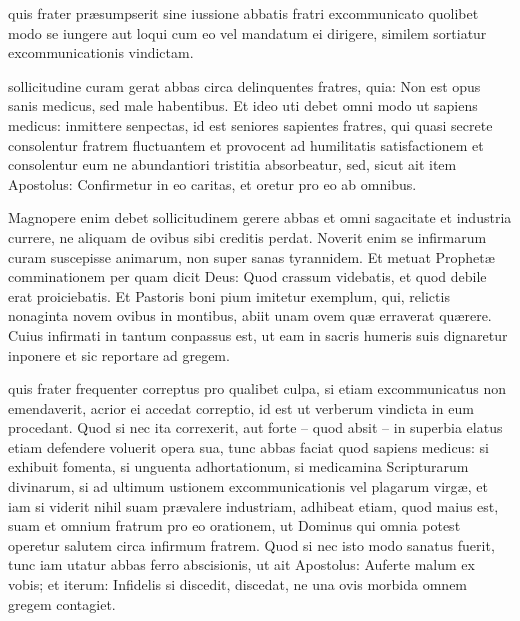 \documentclass[fontsize=9pt,paper=A6,twoside,BCOR=1mm,DIV=22,headinclude]{scrarticle}
\begin{document}
\begin{multicols}{2}
 quis frater præsumpserit sine iussione abbatis fratri excommunicato quolibet modo se iungere aut loqui cum eo vel mandatum ei dirigere, similem sortiatur excommunicationis vindictam. 

 sollicitudine curam gerat abbas circa delinquentes fratres, quia: Non est opus sanis medicus, sed male habentibus. Et ideo uti debet omni modo ut sapiens medicus: inmittere senpectas, id est seniores sapientes fratres, qui quasi secrete consolentur fratrem fluctuantem et provocent ad humilitatis satisfactionem et consolentur eum ne abundantiori tristitia absorbeatur, sed, sicut ait item Apostolus: Confirmetur in eo caritas, et oretur pro eo ab omnibus.

Magnopere enim debet sollicitudinem gerere abbas et omni sagacitate et industria currere, ne aliquam de ovibus sibi creditis perdat. Noverit enim se infirmarum curam suscepisse animarum, non super sanas tyrannidem. Et metuat Prophetæ comminationem per quam dicit Deus: Quod crassum videbatis, et quod debile erat proiciebatis. Et Pastoris boni pium imitetur exemplum, qui, relictis nonaginta novem ovibus in montibus, abiit unam ovem quæ erraverat quærere. Cuius infirmati in tantum conpassus est, ut eam in sacris humeris suis dignaretur inponere et sic reportare ad gregem.

 quis frater frequenter correptus pro qualibet culpa, si etiam excommunicatus non emendaverit, acrior ei accedat correptio, id est ut verberum vindicta in eum procedant. Quod si nec ita correxerit, aut forte – quod absit – in superbia elatus etiam defendere voluerit opera sua, tunc abbas faciat quod sapiens medicus: si exhibuit fomenta, si unguenta adhortationum, si medicamina Scripturarum divinarum, si ad ultimum ustionem excommunicationis vel plagarum virgæ, et iam si viderit nihil suam prævalere industriam, adhibeat etiam, quod maius est, suam et omnium fratrum pro eo orationem, ut Dominus qui omnia potest operetur salutem circa infirmum fratrem. Quod si nec isto modo sanatus fuerit, tunc iam utatur abbas ferro abscisionis, ut ait Apostolus: Auferte malum ex vobis; et iterum: Infidelis si discedit, discedat, ne una ovis morbida omnem gregem contagiet. 


\end{multicols}
\end{document}
